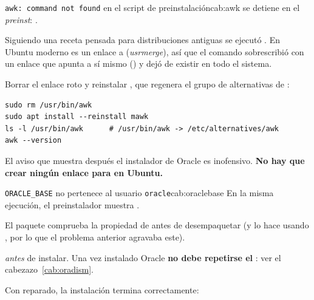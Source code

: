 \begin{cabezazo}{\texttt{awk: command not found} en el script de preinstalación}{cab:awk}
\problema {} se detiene en el \emph{preinst}:
.

\causa Siguiendo una receta pensada para distribuciones antiguas se ejecutó
. En Ubuntu moderno  es un
enlace a  (\emph{usrmerge}), así que el comando sobrescribió
 con un enlace que apunta a sí mismo
() y  dejó de existir en todo el
sistema.

\solucion Borrar el enlace roto y reinstalar , que regenera el
grupo de alternativas de :

\begin{lstlisting}[style=bash]
sudo rm /usr/bin/awk
sudo apt install --reinstall mawk
ls -l /usr/bin/awk      # /usr/bin/awk -> /etc/alternatives/awk
awk --version
\end{lstlisting}

El aviso 
que muestra después el instalador de Oracle es inofensivo.
\textbf{No hay que crear ningún enlace para  en Ubuntu.}
\end{cabezazo}


\begin{cabezazo}{\texttt{ORACLE\_BASE} no pertenece al usuario \texttt{oracle}}{cab:oraclebase}
\problema En la misma ejecución, el preinstalador muestra
.

\causa El paquete comprueba la propiedad de  antes de
desempaquetar (y lo hace usando , por lo que el problema anterior
agravaba este).

\solucion {}
\emph{antes} de instalar. Una vez instalado Oracle \textbf{no debe repetirse el
}: ver el cabezazo~\ref{cab:oradism}.
\end{cabezazo}

Con  reparado, la instalación termina correctamente:


